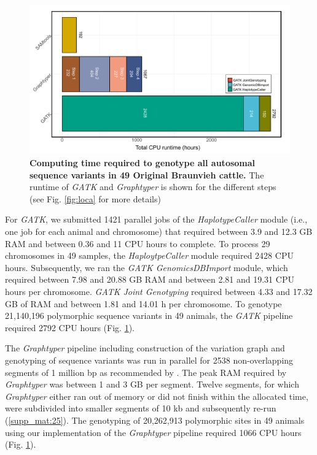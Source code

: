 \documentclass[../main.tex]{subfiles}
\begin{document}
\begin{figure}[!htb]
    \centering
    \includegraphics[width=\textwidth]{paper1/main_figure/Figure4.pdf}
    \caption[Computing time required for genotyping]{\textbf{Computing time required to genotype all autosomal sequence variants in 49 Original Braunvieh cattle.} The runtime of \emph{GATK} and \emph{Graphtyper }is shown for the different steps (see Fig. \ref{fig:loca} for more details)}
    \label{fig:varresource}
\end{figure}

For \emph{GATK}, we submitted 1421 parallel jobs of the \emph{HaplotypeCaller} module (i.e., one job for each animal and chromosome) that required between 3.9 and 12.3 GB RAM and between 0.36 and 11 CPU hours to complete.
To process 29 chromosomes in 49 samples, the \emph{HaploytpeCaller} module required 2428 CPU hours. 
Subsequently, we ran the \emph{GATK GenomicsDBImport} module, which required between 7.98 and 20.88 GB RAM and between 2.81 and 19.31 CPU hours per chromosome. 
\emph{GATK Joint Genotyping} required between 4.33 and 17.32 GB of RAM and between 1.81 and 14.01 h per chromosome. 
To genotype 21,140,196 polymorphic sequence variants in 49 animals, the \emph{GATK} pipeline required 2792 CPU hours (Fig. \ref{fig:varresource}).

The \emph{Graphtyper} pipeline including construction of the variation graph and genotyping of sequence variants was run in parallel for 2538 non-overlapping segments of 1 million bp as recommended by \citet{eggertsson2017graphtyper}. 
The peak RAM required by \emph{Graphtyper} was between 1 and 3 GB per segment. 
Twelve segments, for which \emph{Graphtyper} either ran out of memory or did not finish within the allocated time, were subdivided into smaller segments of 10 kb and subsequently re-run (\ref{supp_mat:25}).
The genotyping of 20,262,913 polymorphic sites in 49 animals using our implementation of the \emph{Graphtyper} pipeline required 1066 CPU hours (Fig. \ref{fig:varresource}).
\end{document}
